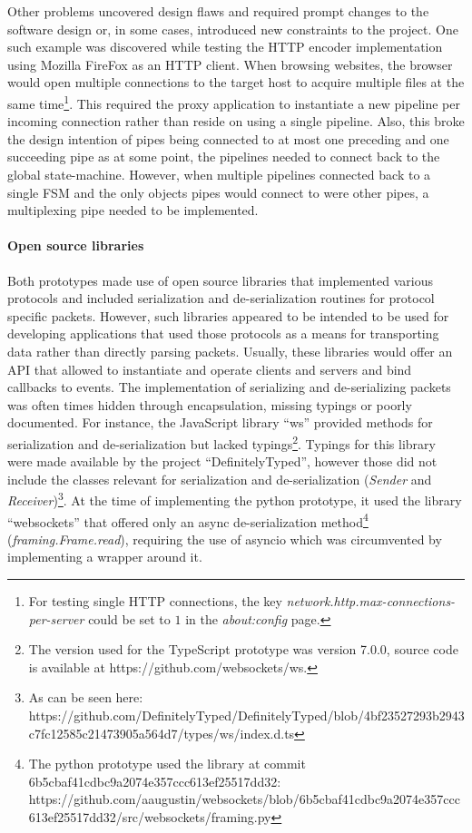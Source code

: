 Other problems uncovered design flaws and required prompt changes to the software design or, in some cases, introduced new constraints to the project. One such example was discovered while testing the \ac{HTTP} encoder implementation using Mozilla FireFox as an \ac{HTTP} client. When browsing websites, the browser would open multiple connections to the target host to acquire multiple files at the same time\footnote{For testing single \ac{HTTP} connections, the key \emph{network.http.max-connections-per-server} could be set to $1$ in the \emph{about:config} page.}. This required the proxy application to instantiate a new pipeline per incoming connection rather than reside on using a single pipeline. Also, this broke the design intention of pipes being connected to at most one preceding and one succeeding pipe as at some point, the pipelines needed to connect back to the global state-machine. However, when multiple pipelines connected back to a single \ac{FSM} and the only objects pipes would connect to were other pipes, a multiplexing pipe needed to be implemented.
\paragraph{Open source libraries} Both prototypes made use of open source libraries that implemented various protocols and included serialization and de-serialization routines for protocol specific packets. However, such libraries appeared to be intended to be used for developing applications that used those protocols as a means for transporting data rather than directly parsing packets. Usually, these libraries would offer an API that allowed to instantiate and operate clients and servers and bind callbacks to events. The implementation of serializing and de-serializing packets was often times hidden through encapsulation, missing typings or poorly documented. For instance, the JavaScript library \enquote{ws} provided methods for serialization and de-serialization but lacked typings\footnote{The version used for the TypeScript prototype was version 7.0.0, source code is available at https://github.com/websockets/ws.}. Typings for this library were made available by the project \enquote{DefinitelyTyped}, however those did not include the classes relevant for serialization and de-serialization (\emph{Sender} and \emph{Receiver})\footnote{As can be seen here: https://github.com/DefinitelyTyped/DefinitelyTyped/blob/4bf23527293b2943c7fc12585c21473905a564d7/types/ws/index.d.ts}. At the time of implementing the python prototype, it used the library \enquote{websockets} that offered only an async de-serialization method\footnote{The python prototype used the library at commit 6b5cbaf41cdbc9a2074e357ccc613ef25517dd32: https://github.com/aaugustin/websockets/blob/6b5cbaf41cdbc9a2074e357ccc613ef25517dd32/src/websockets/framing.py} (\emph{framing.Frame.read}), requiring the use of asyncio which was circumvented by implementing a wrapper around it.

